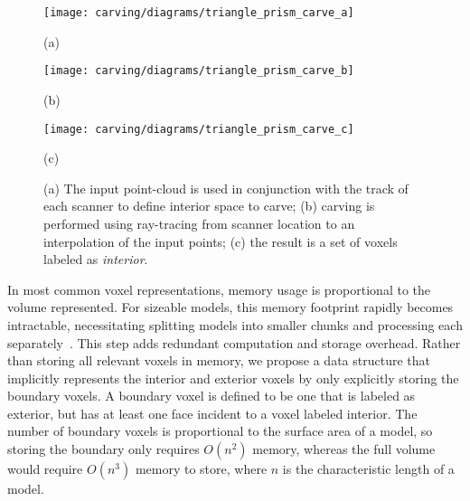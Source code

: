 \documentclass[10pt,twocolumn,twoside]{IEEEtran}
\begin{document}
\begin{figure*}[t]

  \begin{minipage}[b]{0.3\linewidth}
  \centerline{\texttt{[image: carving/diagrams/triangle\_prism\_carve\_a]}}
  \centerline{(a)}\medskip
  \end{minipage}
  \begin{minipage}[b]{0.3\linewidth}
  \centerline{\texttt{[image: carving/diagrams/triangle\_prism\_carve\_b]}}
  \centerline{(b)}\medskip
  \end{minipage}
  \begin{minipage}[b]{0.3\linewidth}
  \centerline{\texttt{[image: carving/diagrams/triangle\_prism\_carve\_c]}}
  \centerline{(c)}\medskip
  \end{minipage}

\caption{(a) The input point-cloud is used in conjunction with the track of each scanner to define interior space to carve; (b) carving is performed using ray-tracing from scanner location to an interpolation of the input points; (c) the result is a set of voxels labeled as {\it interior}.}
\label{fig:carving}
\end{figure*}

In most common voxel representations, memory usage is proportional to the volume represented.  For sizeable models, this memory footprint rapidly becomes intractable, necessitating splitting models into smaller chunks and processing each separately~\cite{Carving,Kintinuous}.  This step adds redundant computation and storage overhead.  Rather than storing all relevant voxels in memory, we propose a data structure that implicitly represents the interior and exterior voxels by only explicitly storing the boundary voxels.  A boundary voxel is defined to be one that is labeled as exterior, but has at least one face incident to a voxel labeled interior.  The number of boundary voxels is proportional to the surface area of a model, so storing the boundary only requires $O(n^2)$ memory, whereas the full volume would require $O(n^3)$ memory to store, where $n$ is the characteristic length of a model.
\end{document}
